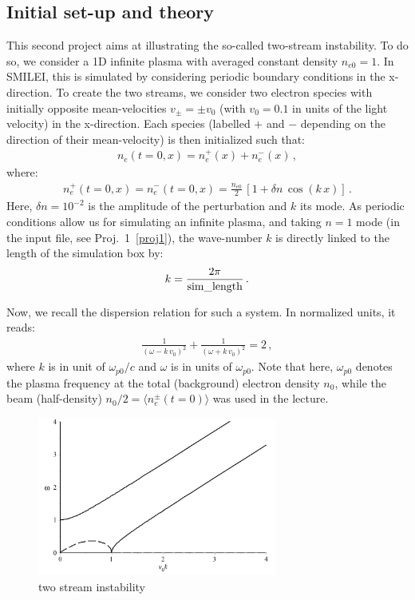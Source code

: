 \documentclass[11pt,a4paper]{article}
\begin{document}
\subsection*{Initial set-up and theory}

This second project aims at illustrating the so-called two-stream instability.
To do so, we consider a 1D infinite plasma with averaged constant density $n_{e0} = 1$. 
In SMILEI, this is simulated by considering periodic boundary conditions in the x-direction. 
To create the two streams, we consider two electron species with initially opposite mean-velocities $v_{\pm} = \pm v_0$ (with $v_0 = 0.1$ in units of the light velocity) in the x-direction.
Each species (labelled $+$ and $-$ depending on the direction of their mean-velocity) is then initialized such that:
\begin{eqnarray}\label{eq_2stream1}
n_e(t=0,x) = n_e^+(x) + n_e^-(x)\,,
\end{eqnarray}
where:
\begin{eqnarray}\label{eq_2stream2}
n_e^+(t=0,x) = n_e^-(t=0,x) = \frac{n_{e0}}{2}\,[1 + \delta n\,\cos(k\,x)]\,.
\end{eqnarray}
Here, $\delta n = 10^{-2}$ is the amplitude of the perturbation and $k$ its mode.
As periodic conditions allow us for simulating an infinite plasma, and taking $n=1$ mode  (in the input file, see Proj.~1~\ref{proj1}), the wave-number $k$ is directly linked to the length of the simulation box by:
\begin{eqnarray}\label{eq_k}
k = \frac{2\pi}{\rm sim\_length}\,.
\end{eqnarray}

Now, we recall the dispersion relation for such a system. In normalized units, it reads:
\begin{eqnarray}\label{eq_disprel_2stream}
\frac{1}{(\omega - k\,v_0)^2} + \frac{1}{(\omega + k\,v_0)^2} = 2\,,
\end{eqnarray}
where $k$ is in unit of $\omega_{p0}/c$ and $\omega$ is in units of $\omega_{p0}$.
Note that here, $\omega_{p0}$ denotes the plasma frequency at the total (background) electron density $n_0$, while the beam (half-density) $n_0/2 = \langle n_e^{\pm}(t=0) \rangle$ was used in the lecture.

\begin{figure}
\centering\includegraphics[width=0.7\textwidth]{Fig_2stream.png}
\caption{two stream instability}
\label{Fig_2stream}
\end{figure}
\end{document}
